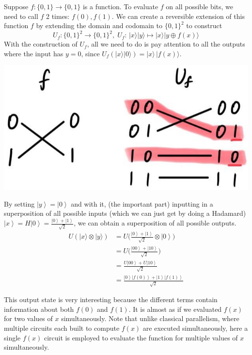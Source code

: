 \documentclass{article}
\newcommand{\ket}[1]{\ensuremath{\left|#1\right\rangle}}
\begin{document}
    \begin{example}
      Suppose $f: \{0, 1\} \longrightarrow \{0, 1\}$ is a function. To evaluate $f$ on all possible bits, we need to call $f$ 2 times: $f(0), f(1)$. We can create a reversible extension of this function $f$ by extending the domain and codomain to $\{0, 1\}^2$ to construct
      \begin{equation} 
        U_f: \{0, 1\}^2 \longrightarrow \{0, 1\}^2, \; U_f: \, |x \rangle |y\rangle \mapsto |x\rangle |y \oplus f(x) \rangle
      \end{equation}
      With the construction of $U_f$, all we need to do is pay attention to all the outputs where the input has $y=0$, since $U_f (|x \rangle |0\rangle) = |x \rangle \, |f(x) \rangle$.
      \begin{center}
        \includegraphics[scale=0.3]{img/f_to_U_one_qubit_reversible.jpg}
      \end{center}
      By setting $\ket{y} = \ket{0}$ and with it, (the important part) inputting in a superposition of all possible inputs (which we can just get by doing a Hadamard) $\ket{x} = H \ket{0} = \frac{\ket{0} + \ket{1}}{\sqrt{2}}$, we can obtain a superposition of all possible outputs.
      \begin{align*}
        U (|x\rangle \otimes |y\rangle) & = U \bigg(\frac{\ket{0} + \ket{1}}{\sqrt{2}} \otimes \ket{0} \bigg) \\ 
                                        & = U \bigg( \frac{\ket{00} + \ket{10}}{\sqrt{2}} \bigg) \\ 
                                        & = \frac{U \ket{00} + U \ket{10}}{\sqrt{2}} \\ 
                                        & = \frac{\ket{0} \ket{f(0)} + \ket{1} \ket{f(1)}}{\sqrt{2}}
      \end{align*}

      This output state is very interesting because the different terms contain information about both $f(0)$ and $f(1)$. It is almost as if we evaluated $f(x)$ for two values of $x$ simultaneously. Note that unlike classical parallelism, where multiple circuits each built to compute $f(x)$ are executed simultaneously, here a single $f(x)$ circuit is employed to evaluate the function for multiple values of $x$ simultaneously.
    \end{example}
\end{document}
